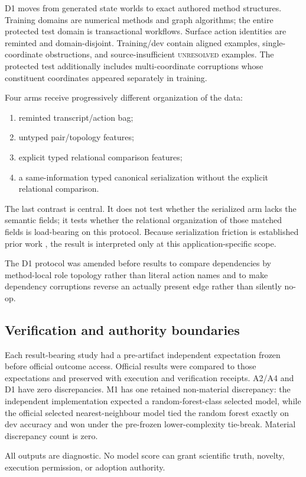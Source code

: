 D1 moves from generated state worlds to exact authored method structures. Training domains are numerical methods and graph algorithms; the entire protected test domain is transactional workflows. Surface action identities are reminted and domain-disjoint. Training/dev contain aligned examples, single-coordinate obstructions, and source-insufficient \textsc{unresolved} examples. The protected test additionally includes multi-coordinate corruptions whose constituent coordinates appeared separately in training.

Four arms receive progressively different organization of the data:
\begin{enumerate}
    \item reminted transcript/action bag;
    \item untyped pair/topology features;
    \item explicit typed relational comparison features;
    \item a same-information typed canonical serialization without the explicit relational comparison.
\end{enumerate}
The last contrast is central. It does not test whether the serialized arm lacks the semantic fields; it tests whether the relational organization of those matched fields is load-bearing on this protocol. Because serialization friction is established prior work \citep{lo2026serialization}, the result is interpreted only at this application-specific scope.

The D1 protocol was amended before results to compare dependencies by method-local role topology rather than literal action names and to make dependency corruptions reverse an actually present edge rather than silently no-op.

\subsection{Verification and authority boundaries}

Each result-bearing study had a pre-artifact independent expectation frozen before official outcome access. Official results were compared to those expectations and preserved with execution and verification receipts. A2/A4 and D1 have zero discrepancies. M1 has one retained non-material discrepancy: the independent implementation expected a random-forest-class selected model, while the official selected nearest-neighbour model tied the random forest exactly on dev accuracy and won under the pre-frozen lower-complexity tie-break. Material discrepancy count is zero.

All outputs are diagnostic. No model score can grant scientific truth, novelty, execution permission, or adoption authority.

